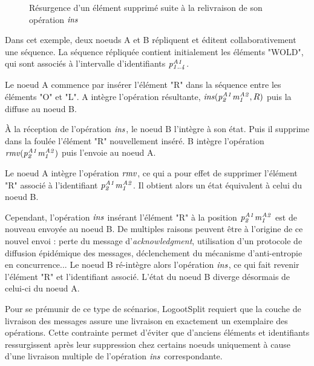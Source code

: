 \begin{figure}[!ht]
{
  }
  \caption{Résurgence d'un élément supprimé suite à la relivraison de son opération $\mathit{ins}$}
  \label{fig:why-exactly-once-delivery}
\end{figure}

Dans cet exemple, deux noeuds A et B répliquent et éditent collaborativement une séquence.
La séquence répliquée contient initialement les éléments "WOLD", qui sont associés à l'intervalle d'identifiants $\mathit{p}^{\mathit{A1}}_{\mathit{1..4}}$.

Le noeud A commence par insérer l'élément "R" dans la séquence entre les éléments "O" et "L".
A intègre l'opération résultante, $\mathit{ins}(\mathit{p}^{\mathit{A1}}_{\mathit{2}}\mathit{m}^{\mathit{A2}}_{\mathit{1}},R)$ puis la diffuse au noeud B.

À la réception de l'opération $\mathit{ins}$, le noeud B l'intègre à son état.
Puis il supprime dans la foulée l'élément "R" nouvellement inséré.
B intègre l'opération $\mathit{rmv}(\mathit{p}^{\mathit{A1}}_{\mathit{2}}\mathit{m}^{\mathit{A2}}_{\mathit{1}})$ puis l'envoie au noeud A.

Le noeud A intègre l'opération $\mathit{rmv}$, ce qui a pour effet de supprimer l'élément "R" associé à l'identifiant $\mathit{p}^{\mathit{A1}}_{\mathit{2}}\mathit{m}^{\mathit{A2}}_{\mathit{1}}$.
Il obtient alors un état équivalent à celui du noeud B.

Cependant, l'opération $\mathit{ins}$ insérant l'élément "R" à la position $\mathit{p}^{\mathit{A1}}_{\mathit{2}}\mathit{m}^{\mathit{A2}}_{\mathit{1}}$ est de nouveau envoyée au noeud B.
De multiples raisons peuvent être à l'origine de ce nouvel envoi : perte du message d'\emph{acknowledgment}, utilisation d'un protocole de diffusion épidémique des messages, déclenchement du mécanisme d'anti-entropie en concurrence...
Le noeud B ré-intègre alors l'opération $\mathit{ins}$, ce qui fait revenir l'élément "R" et l'identifiant associé.
L'état du noeud B diverge désormais de celui-ci du noeud A.

Pour se prémunir de ce type de scénarios, LogootSplit requiert que la couche de livraison des messages assure une livraison en exactement un exemplaire des opérations.
Cette contrainte permet d'éviter que d'anciens éléments et identifiants ressurgissent après leur suppression chez certains noeuds uniquement à cause d'une livraison multiple de l'opération $\mathit{ins}$ correspondante.
